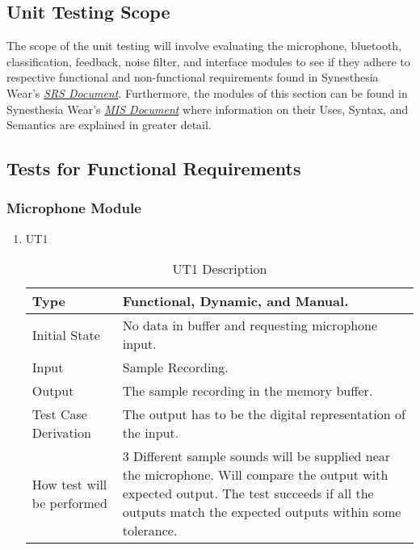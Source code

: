 \documentclass[12pt, titlepage]{article}
\begin{document}
\subsection{Unit Testing Scope}
The scope of the unit testing will involve evaluating the microphone, bluetooth, 
classification, feedback, noise filter, and interface modules to see if they adhere 
to respective functional and non-functional requirements found in Synesthesia Wear’s 
\href{https://github.com/jordanbierbrier/capstone/blob/main/docs/SRS/SRS.pdf}{\textit{SRS Document}}.
Furthermore, the modules of this section can be found in Synesthesia Wear's 
\href{https://github.com/jordanbierbrier/capstone/blob/main/docs/Design/SoftDetailedDes/MIS.pdf}{\textit{MIS Document}}
where information on their Uses, Syntax, and Semantics are explained in greater detail.

\subsection{Tests for Functional Requirements}

\subsubsection{Microphone Module}

\begin{enumerate}

\item{UT1}
\begin{table}[!h]
    \caption{UT1 Description}
\begin{tabular}{ |p{5cm}||p{7cm}| }
    
    \hline
    Type & Functional, Dynamic, and Manual. \\
    \hline
    Initial State  &  No data in buffer and requesting microphone input.\\
    \hline
    Input &   Sample Recording.  \\
    \hline
    Output &   The sample recording in the memory buffer.  \\
    \hline
    Test Case Derivation &   The output has to be the digital representation of the input.\\
    \hline
    How test will be performed & 3 Different sample sounds will be supplied near the microphone. Will compare the output with expected output. The test succeeds if all the outputs match the expected outputs within some tolerance.     \\
    \hline
\end{tabular}
\end{table}    
\end{enumerate}
\end{document}

